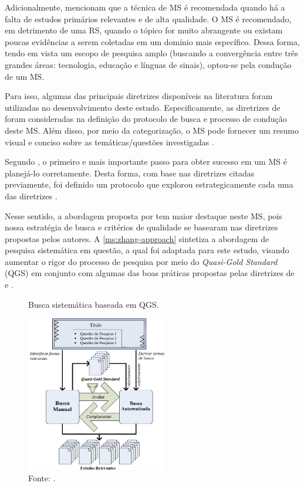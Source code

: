 Adicionalmente,  mencionam que a técnica de MS é recomendada quando há a falta de estudos primários relevantes e de alta qualidade. O MS é recomendado, em detrimento de uma RS, quando o tópico for muito abrangente ou existam poucas evidências a serem coletadas em um domínio mais específico. Dessa forma, tendo em vista um escopo de pesquisa amplo (buscando a convergência entre três grandes áreas: tecnologia, educação e línguas de sinais), optou-se pela condução de um MS. 

Para isso, algumas das principais diretrizes disponíveis na literatura foram utilizadas no desenvolvimento deste estudo. Especificamente, as diretrizes de  foram consideradas na definição do protocolo de busca e processo de condução deste MS. Além disso, por meio da categorização, o MS pode fornecer um resumo visual e conciso sobre as temáticas/questões investigadas \cite{Petersen2008}.

Segundo , o primeiro e mais importante passo para obter sucesso em um MS é planejá-lo corretamente. Desta forma, com base nas diretrizes citadas previamente, foi definido um protocolo que explorou estrategicamente cada uma das diretrizes \cite{Kitchenham2007,Zhang2011,Petersen2015}.

Nesse sentido, a abordagem proposta por  tem maior destaque neste MS, pois nossa estratégia de busca e critérios de qualidade se basearam nas diretrizes propostas pelos autores. A \autoref{ms:zhang-approach} sintetiza a abordagem de pesquisa sistemática em questão, a qual foi adaptada para este estudo, visando aumentar o rigor do processo de pesquisa por meio do \textit{Quasi-Gold Standard} (QGS) em conjunto com algumas das boas práticas propostas pelas diretrizes de  e .

\begin{figure}[htbp]
\caption{Busca sistemática baseada em QGS.}
\label{ms:zhang-approach}
\centerline{\includegraphics[width=0.55\textwidth]{images/zhang-systematic-mapping-approach.png}}
\caption*{Fonte: .}
\end{figure}

